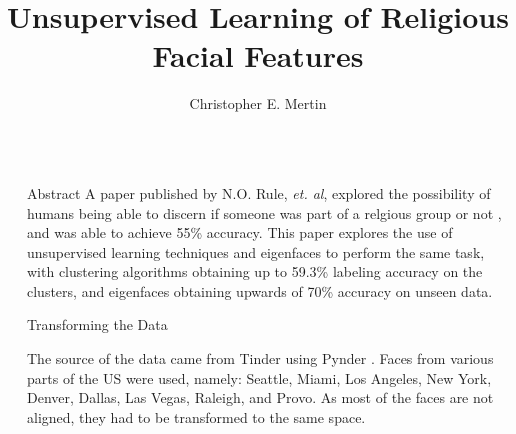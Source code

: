 \documentclass[final]{beamer}
\title{Unsupervised Learning of Religious Facial Features} %
\author{Christopher E. Mertin} %
\institute{School of Computing, University of Utah} %
\newlength{\sepwid}
\newlength{\onecolwid}
\begin{document}

\setlength{\belowcaptionskip}{2ex} %
\setlength\belowdisplayshortskip{2ex} %

\begin{frame}[t] %

\begin{columns}[t] %

\begin{column}{\sepwid}\end{column} %

\begin{column}{\onecolwid} %


\begin{alertblock}{Abstract}
A paper published by N.O. Rule, {\em et. al}, explored the possibility of humans being able to discern if someone was part of a relgious group or not \cite{MormonID}, and was able to achieve 55\% accuracy. This paper explores the use of unsupervised learning techniques and eigenfaces to perform the same task, with clustering algorithms obtaining up to 59.3\% labeling accuracy on the clusters, and eigenfaces obtaining upwards of 70\% accuracy on unseen data. 
\end{alertblock}


\begin{block}{Transforming the Data}

The source of the data came from Tinder using Pynder \cite{pynder}. Faces from various parts of the US were used, namely: Seattle, Miami, Los Angeles, New York, Denver, Dallas, Las Vegas, Raleigh, and Provo. As most of the faces are not aligned, they had to be transformed to the same space.


\end{block}
\end{column}
\end{columns}
\end{frame}
\end{document}
